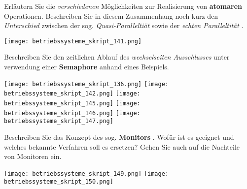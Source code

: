 \documentclass{article}
\begin{document}
\begin{tcolorbox}[colback=white!10!white,colframe=lightgray!75!black,
  savelowerto=\jobname_ex.tex,breakable,enhanced,lines before break=40]

\begin{center}
Erläutern Sie die 
\textit{verschiedenen
} Möglichkeiten zur Realisierung von 
\textbf{atomaren
} Operationen.
Beschreiben Sie in diesem Zusammenhang noch kurz den 
\textit{Unterschied
} zwischen der sog. 
\textit{Quasi-Paralleltiät
} sowie der 
\textit{echten Paralleltität
}.

\end{center}

\tcblower

\justifying
\texttt{[image: betriebssysteme\_skript\_141.png]}

\end{tcolorbox}
\begin{tcolorbox}[colback=white!10!white,colframe=lightgray!75!black,
  savelowerto=\jobname_ex.tex,breakable,enhanced,lines before break=40]

\begin{center}
Beschreiben Sie den zeitlichen Ablauf des 
\textit{wechselseiten Ausschlusses
} unter verwendung einer 
\textbf{Semaphore
} anhand eines Beispiels.

\end{center}

\tcblower

\justifying
\texttt{[image: betriebssysteme\_skript\_136.png]}
\texttt{[image: betriebssysteme\_skript\_142.png]}
\texttt{[image: betriebssysteme\_skript\_145.png]}
\texttt{[image: betriebssysteme\_skript\_146.png]}
\texttt{[image: betriebssysteme\_skript\_147.png]}

\end{tcolorbox}
\begin{tcolorbox}[colback=white!10!white,colframe=lightgray!75!black,
  savelowerto=\jobname_ex.tex,breakable,enhanced,lines before break=40]

\begin{center}
Beschreiben Sie das Konzept des sog. 
\textbf{Monitors
}. Wofür ist es geeignet und welches bekannte Verfahren soll es ersetzen?
Gehen Sie auch auf die Nachteile von Monitoren ein.

\end{center}

\tcblower

\justifying
\texttt{[image: betriebssysteme\_skript\_149.png]}
\texttt{[image: betriebssysteme\_skript\_150.png]}

\end{tcolorbox}
\end{document}
